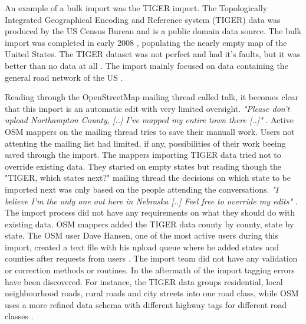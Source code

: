 An example of a bulk import was the TIGER import. The Topologically Integrated Geographical Encoding and Reference system (TIGER) data was produced by the US Census Bureau and is a public domain data source. The bulk import was completed in early 2008 \cite{Zielstra2013}, populating the nearly empty map of the United States. The TIGER dataset was not perfect and had it's faults, but it was better than no data at all \cite{Willis2008}. The import mainly focused on data containing the general road network of the US \cite{Zielstra2013}. 

Reading through the OpenStreetMap mailing thread called talk, it becomes clear that this import is an automatic edit with very limited oversight. \textit{"Please don't upload Northampton County, [..] I've mapped my entire town there [..]"} \cite{Mielczarek2007}.  Active OSM mappers on the mailing thread tries to save their manuall work. Users not attenting the mailing list had limited, if any, possibilities of their work beeing saved through the import. The mappers importing TIGER data tried not to override existing data. They started on empty states but reading though the "TIGER, which states next?" mailing thread the decisions on which state to be imported next was only based on the people attending the conversations. \textit{"I believe I'm the only one out here in Nebraska [..] Feel free to override my edits"} \cite{Bishop2007}. The import process did not have any requirements on what they should do with existing data. OSM mappers added the TIGER data county by county, state by state. The OSM user Dave Hansen, one of the most active users during this import, created a text file with his upload queue \cite{Hansen2007a} where he added states and counties after requests from users \cite{Hansen2007}\cite{Hansen2007b}. The import team did not have any validation or correction methods or routines. In the aftermath of the import tagging errors have been discovered. For instance, the TIGER data groups residential, local neighbourhood roads, rural roads and city streets into one road class, while OSM uses a more refined data schema with different highway tags for different road classes \cite{Zielstra2013}.

